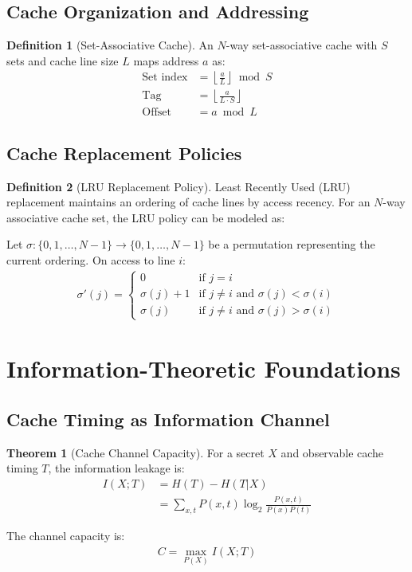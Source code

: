\documentclass[11pt,a4paper]{article}
\theoremstyle{definition}
\newtheorem{definition}{Definition}[section]
\newtheorem{theorem}{Theorem}[section]
\begin{document}
\subsection{Cache Organization and Addressing}

\begin{definition}[Set-Associative Cache]
An $N$-way set-associative cache with $S$ sets and cache line size $L$ maps address $a$ as:
\begin{align}
\text{Set index} &= \left\lfloor \frac{a}{L} \right\rfloor \bmod S \\
\text{Tag} &= \left\lfloor \frac{a}{L \cdot S} \right\rfloor \\
\text{Offset} &= a \bmod L
\end{align}
\end{definition}

\subsection{Cache Replacement Policies}

\begin{definition}[LRU Replacement Policy]
Least Recently Used (LRU) replacement maintains an ordering of cache lines by access recency. For an $N$-way associative cache set, the LRU policy can be modeled as:

Let $\sigma: \{0, 1, \ldots, N-1\} \to \{0, 1, \ldots, N-1\}$ be a permutation representing the current ordering. On access to line $i$:
\begin{align}
\sigma'(j) = \begin{cases}
0 & \text{if } j = i \\
\sigma(j) + 1 & \text{if } j \neq i \text{ and } \sigma(j) < \sigma(i) \\
\sigma(j) & \text{if } j \neq i \text{ and } \sigma(j) > \sigma(i)
\end{cases}
\end{align}
\end{definition}

\section{Information-Theoretic Foundations}

\subsection{Cache Timing as Information Channel}

\begin{theorem}[Cache Channel Capacity]
For a secret $X$ and observable cache timing $T$, the information leakage is:
\begin{align}
I(X; T) &= H(T) - H(T|X) \\
&= \sum_{x,t} P(x,t) \log_2 \frac{P(x,t)}{P(x)P(t)}
\end{align}

The channel capacity is:
\begin{align}
C = \max_{P(X)} I(X; T)
\end{align}
\end{theorem}
\end{document}
